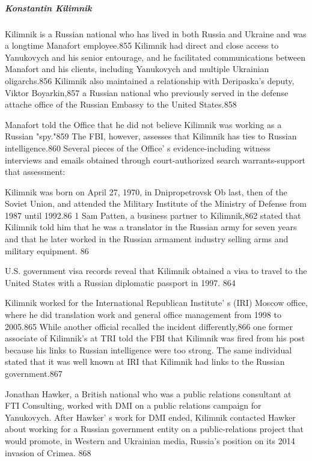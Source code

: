\subparagraph{Konstantin Kilimnik}

Kilimnik is a  Russian national who has lived in both Russia and Ukraine and was a longtime Manafort employee.855 Kilimnik had direct and close access to Yanukovych and his senior entourage, and he facilitated communications between Manafort and his clients, including Yanukovych and multiple Ukrainian oligarchs.856 Kilimnik also maintained a  relationship with Deripaska's deputy, Viktor Boyarkin,857 a Russian national who previously served in the defense attache office of the Russian Embassy to the United States.858

Manafort told the Office that he did not believe Kilimnik was working as a  Russian "spy."859 The FBI, however, assesses that Kilimnik has ties to Russian intelligence.860 Several pieces of the Office' s evidence-including witness interviews and emails obtained through court-authorized search warrants-support that assessment:

Kilimnik was born on April 27, 1970, in Dnipropetrovsk Ob last, then of the Soviet Union, and attended the Military Institute of the Ministry of Defense from 1987 until 1992.86 1 Sam Patten, a  business partner to Kilimnik,862 stated that Kilimnik told him that he was a translator in the Russian army for seven years and that he later worked in the Russian armament industry selling arms and military equipment. 86

U.S. government visa records reveal that Kilimnik obtained a visa to travel to the United States with a Russian diplomatic passport in 1997. 864

Kilimnik worked for the International Republican Institute' s (IRI) Moscow office, where he did translation work and general office management from 1998 to 2005.865 While another official recalled the incident differently,866 one former associate of Kilimnik's at TRI told the FBI that Kilimnik was fired from his post because his links to Russian intelligence were too strong. The same individual stated that it was well known at IRI that Kilimnik had links to the Russian government.867

Jonathan Hawker, a British national who was a public relations consultant at FTI Consulting,  worked with DMI on a  public relations campaign for Yanukovych. After Hawker' s work for DMI ended, Kilimnik contacted Hawker about working for a Russian government entity on a  public-relations project that would promote, in Western and Ukrainian media, Russia's position on its 2014 invasion of Crimea. 868

